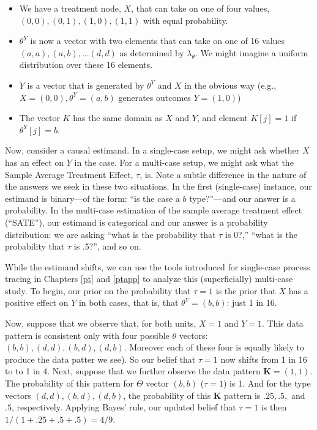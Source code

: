 \documentclass[
  12pt,
]{book}
\providecommand{\tightlist}{%
  \setlength{\itemsep}{0pt}\setlength{\parskip}{0pt}}
\begin{document}
\begin{itemize}
\tightlist
\item
  We have a treatment node, \(X\), that can take on one of four values, \((0,0), (0,1), (1,0), (1,1)\) with equal probability.
\item
  \(\theta^Y\) is now a vector with two elements that can take on one of 16 values \((a,a), (a,b),\dots (d,d)\) as determined by \(\lambda_\theta\). We might imagine a uniform distribution over these 16 elements.
\item
  \(Y\) is a vector that is generated by \(\theta^Y\) and \(X\) in the obvious way (e.g., \(X=(0,0), \theta^Y=(a,b)\) generates outcomes \(Y=(1,0)\))
\item
  The vector \(K\) has the same domain as \(X\) and \(Y\), and element \(K[j]=1\) if \(\theta^Y[j]=b\).
\end{itemize}

Now, consider a causal estimand. In a single-case setup, we might ask whether \(X\) has an effect on \(Y\) in the case. For a multi-case setup, we might ask what the Sample Average Treatment Effect, \(\tau\), is. Note a subtle difference in the nature of the answers we seek in these two situations. In the first (single-case) instance, our estimand is binary---of the form: ``is the case a \(b\) type?''---and our answer is a probability. In the multi-case estimation of the sample average treatment effect (``SATE''), our estimand is categorical and our answer is a probability distribution: we are asking ``what is the probability that \(\tau\) is 0?,'' ``what is the probability that \(\tau\) is .5?'', and so on.

While the estimand shifts, we can use the tools introduced for single-case process tracing in Chapters \ref{pt} and \ref{ptapp} to analyze this (superficially) multi-case study. To begin, our prior on the probability that \(\tau=1\) is the prior that \(X\) has a positive effect on \(Y\) in both cases, that is, that \(\theta^Y = (b,b)\): just 1 in 16.

Now, suppose that we observe that, for both units, \(X=1\) and \(Y=1\). This data pattern is consistent only with four possible \(\theta\) vectors: \((b,b), (d,d), (b, d), (d,b)\). Moreover each of these four is equally likely to produce the data patter we see). So our belief that \(\tau=1\) now shifts from 1 in 16 to to 1 in 4. Next, suppose that we further observe the data pattern \(\mathbf K = (1,1)\). The probability of this pattern for \(\Theta\) vector \((b,b)\) (\(\tau = 1\)) is 1. And for the type vectors \((d,d), (b, d), (d,b)\), the probability of this \(\mathbf K\) pattern is \(.25, .5,\) and \(.5\), respectively. Applying Bayes' rule, our updated belief that \(\tau = 1\) is then \(1/(1 + .25 + .5 + .5) = 4/9\).
\end{document}
